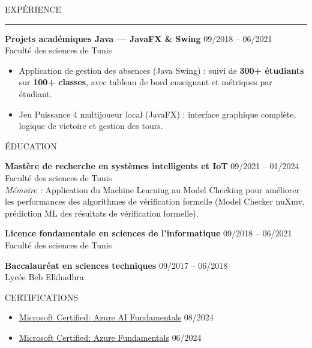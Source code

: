 \documentclass{resume}
\begin{document}
\begin{rSection}{EXPÉRIENCE}
\vspace{0.05cm}
\noindent\rule{\textwidth}{0.2pt}
\vspace{0.05cm}

{\bf Projets académiques Java — JavaFX \& Swing} \hfill {09/2018 -- 06/2021}\\
Faculté des sciences de Tunis
\begin{itemize}
    \item Application de gestion des absences (Java Swing) : suivi de \textbf{300+ étudiants}
          sur \textbf{100+ classes}, avec tableau de bord enseignant et métriques par étudiant.
    \item Jeu Puissance 4 multijoueur local (JavaFX) : interface graphique complète,
          logique de victoire et gestion des tours.
\end{itemize}

\end{rSection}

\begin{rSection}{ÉDUCATION}

{\bf Mastère de recherche en systèmes intelligents et IoT} \hfill {09/2021 -- 01/2024}\\
Faculté des sciences de Tunis\\
\textit{Mémoire :} Application du Machine Learning au Model Checking pour améliorer les
performances des algorithmes de vérification formelle (Model Checker nuXmv, prédiction ML des résultats de vérification formelle).

{\bf Licence fondamentale en sciences de l'informatique} \hfill {09/2018 -- 06/2021}\\
Faculté des sciences de Tunis

{\bf Baccalauréat en sciences techniques} \hfill {09/2017 -- 06/2018}\\
Lycée Beb Elkhadhra

\end{rSection}

\begin{rSection}{CERTIFICATIONS}

\begin{itemize}
    \item \href{https://www.credly.com/go/jtnKftOhsl8RpgTLFgYZ9w}
          {Microsoft Certified: Azure AI Fundamentals} \hfill {08/2024}
    \item \href{https://www.credly.com/badges/4c049e6e-75ed-4c6d-a739-bb3e10a4c768/linked_in?t=sfc28d}
          {Microsoft Certified: Azure Fundamentals} \hfill {06/2024}
\end{itemize}

\end{rSection}
\end{document}
